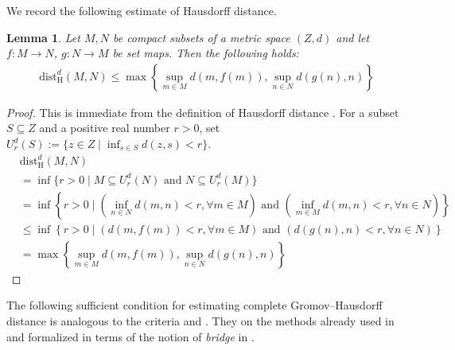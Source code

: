 \documentclass{amsart}
\theoremstyle{plain}
\newtheorem{lemma}[theorem]{Lemma}
\theoremstyle{definition}
\theoremstyle{remark}
\begin{document}
	We record the following estimate of Hausdorff distance. 
	
	\begin{lemma}\label{lem:Hausdorff-distance-estimate}
		Let $M, N$ be compact subsets of a metric space $(Z,d)$ and let $f : M \rightarrow N$, $g : N \rightarrow M$ be set maps.
		Then the following holds:
		\begin{align}
			\mathrm{dist}_\mathrm{H}^d(M,N) 
			\leq \max \left\{ \sup_{m \in M} d(m,f(m)), \sup_{n \in N} d(g(n),n) \right\}
		\end{align}
	\end{lemma}
	
	\begin{proof}
		This is immediate from the definition of Hausdorff distance \cite[Definition 7.3.1]{BBI01}.
		For a subset $S \subseteq Z$ and a positive real number $r > 0$, set $U_r^d(S) := \{z \in Z \mid \inf_{s \in S} d(z,s) < r\}$.
		\begin{align}
			&\mathrm{dist}_\mathrm{H}^d(M,N) \\
			&= \inf \{r > 0 \mid M \subseteq U_r^d(N) \text{ and } N \subseteq U_r^d(M)\} \\
			&= \inf \left\{ r > 0 \mid \left(\inf_{n \in N} d(m,n) < r, \forall m \in M\right) \text{ and } \left(\inf_{m \in M} d(m,n) < r, \forall n \in N\right) \right\}  \\
			&\leq \inf \left\{ r > 0 \mid \left(d(m,f(m)) < r, \forall m \in M\right) \text{ and } \left(d(g(n),n) < r, \forall n \in N\right) \right\}  \\
			&= \max \left\{ \sup_{m \in M} d(m,f(m)), \sup_{n \in N} d(g(n),n) \right\}
		\end{align}
	\end{proof}
	
	The following sufficient condition for estimating complete Gromov--Hausdorff distance is analogous to the criteria \cite[Proposition 4]{vS21v1} and \cite[Proposition 2.14]{KK22}.
	They on the methods already used in \cite{Rie98,Rie99} and formalized in terms of the notion of \emph{bridge} in \cite{Rie04}.
	
\end{document}
